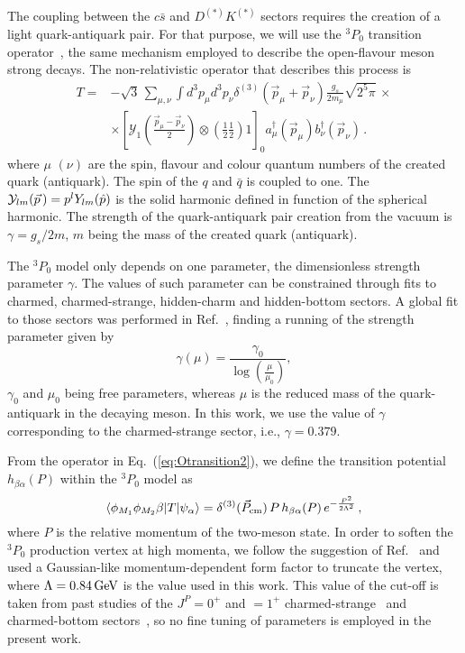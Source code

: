 \documentclass[aps, prd, floatfix, twocolumn, superscriptaddress, nofootinbib]{revtex4-1}
\begin{document}
The coupling between the $c\bar s$ and $D^{(*)}K^{(*)}$
sectors requires the creation of a light quark-antiquark pair. For that purpose,
we will use the $^{3}P_{0}$ transition
operator~\cite{LeYaouanc:1972ae}, the same mechanism employed to describe the
open-flavour meson strong decays. The non-relativistic operator that describes this process is
\begin{equation}
\begin{split}
T =& -\sqrt{3} \, \sum_{\mu,\nu}\int d^{3}\!p_{\mu}d^{3}\!p_{\nu}
\delta^{(3)}(\vec{p}_{\mu}+\vec{p}_{\nu})\frac{g_{s}}{2m_{\mu}}\sqrt{2^{5}\pi}
\,\times \\
&
\times \left[\mathcal{Y}_{1}\left(\frac{\vec{p}_{\mu}-\vec{p}_{\nu}}{2}
\right)\otimes\left(\frac{1}{2}\frac{1}{2}\right)1\right]_{0}a^{\dagger}_{\mu}
(\vec{p}_{\mu})b^{\dagger}_{\nu}(\vec{p}_{\nu}) \,.
\label{eq:Otransition2}
\end{split}
\end{equation}
where $\mu$ $(\nu)$ are the spin, flavour and colour quantum numbers of the
created quark (antiquark). The spin of the $q$ and $\bar q$ is coupled to
one. The ${\cal Y}_{lm}(\vec{p}\,)=p^{l}Y_{lm}(\hat{p})$ is the solid harmonic
defined in function of the spherical harmonic. The strength of the quark-antiquark pair
creation from the vacuum is $\gamma=g_{s}/2m$, $m$ being  the mass of the
created quark (antiquark).

The $^3P_0$ model only depends on one parameter, the dimensionless strength
parameter $\gamma$. The values of such parameter can be constrained through
fits to charmed, charmed-strange, hidden-charm and hidden-bottom sectors.
A global fit to those sectors was performed in Ref.~\cite{Segovia:2012cd},
finding a running of the strength parameter given by
\begin{equation}
\gamma(\mu) = \frac{\gamma_{0}}{\log\left(\frac{\mu}{\mu_{0}}\right)},
\label{eq:fitgamma}
\end{equation}
$\gamma_{0}$ and $\mu_{0}$ being  free parameters, whereas $\mu$ is the reduced
mass of the quark-antiquark in the decaying meson. In this work,
we use the value of $\gamma$ corresponding to the charmed-strange
sector, i.e., $\gamma=0.379$.



From the operator in Eq.~(\ref{eq:Otransition2}), we define the transition
potential $h_{\beta \alpha}(P)$ within the $^{3}P_{0}$ model
as~
\begin{equation}
\langle \phi_{M_1} \phi_{M_2} \beta | T | \psi_\alpha \rangle =
\delta^{(3)}(\vec P_{\rm cm})\,P \, h_{\beta \alpha}(P) \,
e^{-\frac{P^2}{2\Lambda^2}}\,,
\label{Vab}
\end{equation}
where $P$ is the relative momentum of the two-meson state.
In order to soften the $^3P_0$ production vertex at high momenta,
we follow the suggestion of Ref.~\cite{Morel:2002vk} and used a Gaussian-like
momentum-dependent form factor to truncate the vertex,
where $\Lambda=0.84\,{\rm GeV}$ is the value used in this work. 
This value of the cut-off is taken from past studies of the $J^P=0^+$ and $=1^+$
charmed-strange~\cite{Ortega:2016mms} and charmed-bottom sectors~\cite{Ortega:2016pgg}, so no fine tuning
of parameters is employed in the present work.
\end{document}
